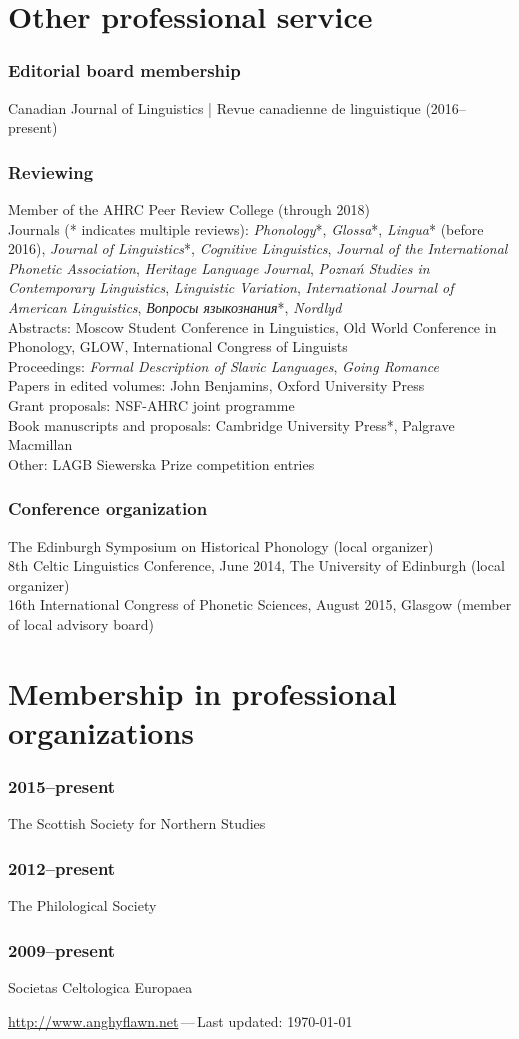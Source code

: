 \documentclass[a4paper,12pt]{article}
\newlength\blockwidth
\newcommand\cvitem[1]{\hspace*{\blockwidth}\begin{minipage}[t]{\linewidth-\blockwidth}
#1
\end{minipage}\par}
\newcommand{\block}[2]{\subsubsection{#1}\cvitem{#2}}
\begin{document}
\section{Other professional service}

\block{Editorial board membership}{Canadian Journal of Linguistics | Revue canadienne de linguistique (2016--present)}
\block{Reviewing}{Member of the AHRC Peer Review College (through 2018)\\Journals (* indicates multiple reviews): \emph{Phonology}*, \emph{Glossa}*, \emph{Lingua}* (before 2016), \emph{Journal of Linguistics}*, \emph{Cognitive Linguistics}, \emph{Journal of the International Phonetic Association}, \emph{Heritage Language Journal}, \emph{Poznań Studies in Contemporary Linguistics}, \emph{Linguistic Variation}, \emph{International Journal of American Linguistics}, \emph{Вопросы языкознания}*, \emph{Nordlyd}\\
Abstracts: Moscow Student Conference in Linguistics, Old World Conference in Phonology, GLOW, International Congress of Linguists\\
Proceedings: \emph{Formal Description of Slavic Languages}, \emph{Going Romance}\\
Papers in edited volumes: John Benjamins, Oxford University Press\\
Grant proposals: NSF-AHRC joint programme\\
Book manuscripts and proposals: Cambridge University Press*, Palgrave Macmillan\\
Other: LAGB Siewerska Prize competition entries}
\block{Conference organization}{The Edinburgh Symposium on Historical Phonology (local organizer)\\
8th Celtic Linguistics Conference, June 2014, The University of Edinburgh (local organizer)\\
16th International Congress of Phonetic Sciences, August 2015, Glasgow (member of local advisory board)}

\section{Membership in professional organizations}
\block{2015--present}{The Scottish Society for Northern Studies}
\block{2012--present}{The Philological Society}
\block{2009--present}{Societas Celtologica Europaea}

\vfill{}
\hrulefill

\begin{center}
{\footnotesize \href{http://www.anghyflawn.net}{http://www.anghyflawn.net}{\,---\,}Last  updated: \today
}
\end{center}
\end{document}
